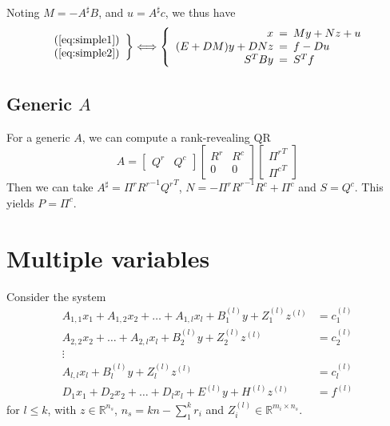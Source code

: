 \documentclass[]{article}
\theoremstyle{definition}
\newcommand{\BIN}{\begin{bmatrix}}
\newcommand{\BOUT}{\end{bmatrix}}
\begin{document}
Noting $M = -A^\sharp B$, and $u = A^\sharp c$, we thus have
\begin{equation*}
  \left. \begin{array}{c} (\ref{eq:simple1}) \\ (\ref{eq:simple2}) \end{array} \right\}
	\Longleftrightarrow
	\left\{ \begin{array}{rcl}
	x \hspace{-5pt}&=&\hspace{-5pt} M y + N z + u \\
	(E + D M) y + D N z \hspace{-5pt}&=&\hspace{-5pt} f - D u \\
	S^T B y \hspace{-5pt}&=&\hspace{-5pt} S^T f
	\end{array} \right.
\end{equation*}

\subsection{Generic $A$}
For a generic $A$, we can compute a rank-revealing QR
\begin{equation}
	A = \BIN Q^r & Q^c \BOUT \BIN R^r & R^c \\ 0 & 0 \BOUT \BIN {\Pi^r}^T \\ {\Pi^c}^T \BOUT
\end{equation}
Then we can take $A^{\sharp} = {\Pi^r} {R^r}^{-1} {Q^r}^T$, $N = - \Pi^r {R^r}^{-1} R^c + \Pi^c$ and $S = Q^c$. This yields $P = \Pi^c$.



\section{Multiple variables}
Consider the system
\begin{align}
A_{1,1} x_1 + A_{1,2} x_2 + \ldots + A_{1,l} x_l + B_1^{(l)} y + Z_1^{(l)} z^{(l)}&= c_1^{(l)} \label{eq:triang_1}\\
A_{2,2} x_2 + \ldots + A_{2,l} x_l + B_2^{(l)} y + Z_2^{(l)} z^{(l)}&= c_2^{(l)} \label{eq:triang_2}\\
\vdots& \nonumber\\
A_{l,l} x_l + B_l^{(l)} y + Z_l^{(l)} z^{(l)}&= c_l^{(l)} \label{eq:triang_l}\\
D_1 x_1 + D_2 x_2 + \ldots + D_l x_l + E^{(l)} y + H^{(l)} z^{(l)}&= f^{(l)} \label{eq:other_}
\end{align}
for $l \leq k$, with $z \in \mathbb{R}^{n_s}$, $n_s = kn - \sum_1^k{r_i}$ and $Z_i^{(l)} \in \mathbb{R}^{m_i \times n_s}$.
\end{document}
